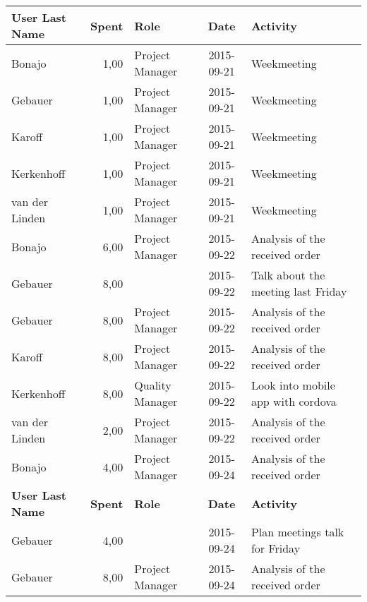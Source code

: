 \begin{longtable}{ l r p{2cm} c p{4cm}}
		\textbf{User Last Name} & \textbf{Spent} & \textbf{Role} & \textbf{Date} & \textbf{Activity} \\
		\hline
		Bonajo                  & 1,00           & Project Manager & 2015-09-21    & Weekmeeting                                     \\
		Gebauer                 & 1,00           & Project Manager & 2015-09-21    & Weekmeeting                                     \\
		Karoff                  & 1,00           & Project Manager & 2015-09-21    & Weekmeeting                                     \\
		Kerkenhoff              & 1,00           & Project Manager & 2015-09-21    & Weekmeeting                                     \\
		van der Linden          & 1,00           & Project Manager & 2015-09-21    & Weekmeeting                                     \\
		Bonajo                  & 6,00           & Project Manager & 2015-09-22    & Analysis of the received order                  \\
		Gebauer                 & 8,00           &                 & 2015-09-22    & Talk about the meeting last Friday              \\
		Gebauer                 & 8,00           & Project Manager & 2015-09-22    & Analysis of the received order                  \\
		Karoff                  & 8,00           & Project Manager & 2015-09-22    & Analysis of the received order                  \\
		Kerkenhoff              & 8,00           & Quality Manager & 2015-09-22    & Look into mobile app with cordova               \\
		van der Linden          & 2,00           & Project Manager & 2015-09-22    & Analysis of the received order                  \\
		Bonajo                  & 4,00           & Project Manager & 2015-09-24    & Analysis of the received order                  \\
		\textbf{User Last Name} & \textbf{Spent} & \textbf{Role} & \textbf{Date} & \textbf{Activity} \\
		\hline
		Gebauer                 & 4,00           &                 & 2015-09-24    & Plan meetings talk for Friday                   \\
		Gebauer                 & 8,00           & Project Manager & 2015-09-24    & Analysis of the received order                  \\

\end{longtable}
